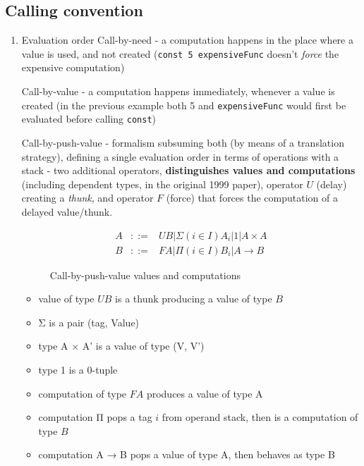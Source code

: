 \documentclass[english,zadani,odsaz]{fitthesis}
\begin{document}
\subsection{Calling convention}
\label{sec:orge8458d6}

\begin{enumerate}
\item Evaluation order
\label{sec:orgceb7304}
Call-by-need - a computation happens in the place where a value is used, and not
created (\texttt{const 5 expensiveFunc} doesn't \emph{force} the expensive computation)

Call-by-value - a computation happens immediately, whenever a value is created
(in the previous example both 5 and \texttt{expensiveFunc} would first be evaluated
before calling \texttt{const})

Call-by-push-value - formalism subsuming both (by means of a translation
strategy), defining a single evaluation order in terms of operations with a
stack - two additional operators, \textbf{distinguishes values and computations}
(including dependent types, in the original 1999 paper), operator \(U\) (delay)
creating a \emph{thunk}, and operator \(F\) (force) that forces the computation of a
delayed value/thunk.

\begin{figure}
\[\begin{array}{ccll}
A & ::= & U B | Σ(i∈I)A_i | 1 | A × A \\
B & ::= & F A | Π(i∈I)B_i | A → B
\end{array}\]
\caption{Call-by-push-value values and computations}
\end{figure}

\begin{itemize}
\item value of type \(UB\) is a thunk producing a value of type \(B\)
\item Σ is a pair (tag, Value)
\item type A × A' is a value of type (V, V')
\item type 1 is a 0-tuple
\item computation of type \(FA\) produces a value of type A
\item computation Π pops a tag \(i\) from operand stack, then is a computation of type \(B\)
\item computation A → B pops a value of type A, then behaves as type B
\end{itemize}


\end{enumerate}
\end{document}
